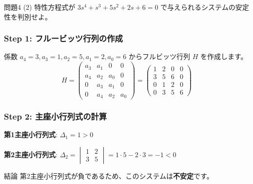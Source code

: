 \documentclass[11pt,a4paper]{ltjsarticle}
\begin{document}
\hrulefill
\vspace{1cm}

\begin{problem}{問題4 (2)}
    特性方程式が $3s^4+s^3+5s^2+2s+6=0$ で与えられるシステムの安定性を判別せよ。
\end{problem}

\begin{solution}
    \subsubsection*{Step 1: フルービッツ行列の作成}
    係数 $a_4=3, a_3=1, a_2=5, a_1=2, a_0=6$ からフルビッツ行列 $H$ を作成します。
    $$ H = \begin{pmatrix} a_3 & a_1 & 0 & 0 \\ a_4 & a_2 & a_0 & 0 \\ 0 & a_3 & a_1 & 0 \\ 0 & a_4 & a_2 & a_0 \end{pmatrix} = \begin{pmatrix} 1 & 2 & 0 & 0 \\ 3 & 5 & 6 & 0 \\ 0 & 1 & 2 & 0 \\ 0 & 3 & 5 & 6 \end{pmatrix} $$

    \subsubsection*{Step 2: 主座小行列式の計算}
    \textbf{第1主座小行列式}: $\Delta_1 = 1 > 0$
    
    \textbf{第2主座小行列式}: $\Delta_2 = \begin{vmatrix} 1 & 2 \\ 3 & 5 \end{vmatrix} = 1 \cdot 5 - 2 \cdot 3 = -1 < 0$
\end{solution}

\begin{conclusion}{結論}
    第2主座小行列式が負であるため、このシステムは\textbf{不安定}です。
\end{conclusion}
\end{document}
